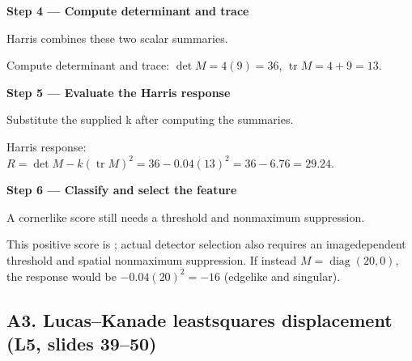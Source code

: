 \documentclass[letterpaper,11pt,english,openany,oneside]{jupyterBook}
\begin{document}
\par

\par\medskip{}
{\color{QuizStepRed}\bfseries Step 4 — Compute determinant and trace}\par\smallskip

\sphinxAtStartPar
{} Harris combines these two scalar summaries.

\sphinxAtStartPar
Compute determinant and trace: {\color{QuizMathBlue} \(\det M=4(9)=36\)}, {\color{QuizMathBlue} \(\operatorname{tr}M=4+9=13\)}.

\par

\par\medskip{}
{\color{QuizStepRed}\bfseries Step 5 — Evaluate the Harris response}\par\smallskip

\sphinxAtStartPar
{} Substitute the supplied k after computing the summaries.

\sphinxAtStartPar
Harris response: {\color{QuizMathBlue} \(R=\det M-k(\operatorname{tr}M)^2=36-0.04(13)^2=36-6.76=\boxed{29.24}\)}.

\par

\par\medskip{}
{\color{QuizStepRed}\bfseries Step 6 — Classify and select the feature}\par\smallskip

\sphinxAtStartPar
{} A corner\sphinxhyphen{}like score still needs a threshold and nonmaximum suppression.

\sphinxAtStartPar
This positive score is ; actual detector selection also requires an image\sphinxhyphen{}dependent threshold and spatial nonmaximum suppression. If instead {\color{QuizMathBlue} \(M=\operatorname{diag}(20,0)\)}, the response would be {\color{QuizMathBlue} \(-0.04(20)^2=-16\)} (edge\sphinxhyphen{}like and singular).

\par


\subsection{A3. Lucas–Kanade least\sphinxhyphen{}squares displacement (L5, slides 39–50)}
\label{\detokenize{lectures/lecture05/quiz-workbook:a3-lucaskanade-least-squares-displacement-l5-slides-3950}}\label{\detokenize{lectures/lecture05/quiz-workbook:quiz-source-a3}}
\sphinxAtStartPar
{}
\end{document}

